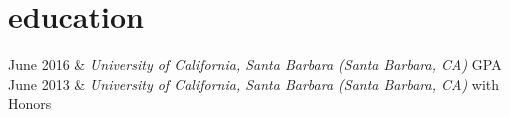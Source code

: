 \documentclass[
    changecolor={70,130,180}, 
]{cv-roald}
\newcommand{\paw}{\faPaw \hspace{.5mm}}
\begin{document}

\section*{\paw{} education}
\begin{tabularcv}
June 2016   &   \newline \emph{University of California, Santa Barbara  \hspace{2mm} (Santa Barbara, CA)}
                 GPA                \\
                
June 2013   &   
\newline \emph{University of California, Santa Barbara  \hspace{2mm} (Santa Barbara, CA)}
                \newline with Honors
\end{tabularcv}

\end{document}
